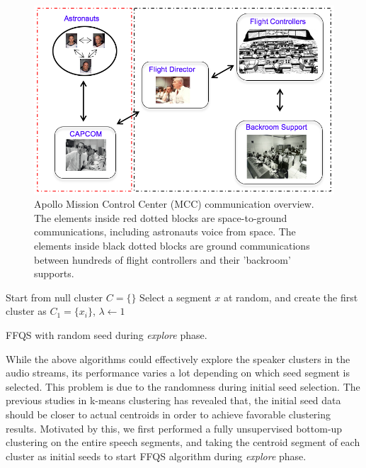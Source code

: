 \documentclass[journal]{IEEEtran}
\begin{document}
\begin{figure}[t]
\centering
	\includegraphics[width=0.75\linewidth]{figs/comm5}
	\caption{Apollo Mission Control Center (MCC) communication overview. The elements inside red dotted blocks are space-to-ground communications, including astronauts voice from space. The elements inside black dotted blocks are ground communications between hundreds of flight controllers and their 'backroom' supports. }
	\label{fig:comm}
\end{figure} 
\begin{algorithm}
	Start from null cluster $C= \{\}$\;
	Select a segment $x$ at random, and create the first cluster as $C_1 = \{x_i\}$, $\lambda \leftarrow 1$\; 
	\caption{FFQS with random seed during \textit{explore} phase.}
	\label{a1}
\end{algorithm}
 
While the above algorithms could effectively explore the speaker clusters in the audio streams, its performance varies a lot depending on which seed segment is selected. This problem is due to the randomness during initial seed selection. The previous studies in k-means clustering has revealed that, the initial seed data should be closer to actual centroids in order to achieve favorable clustering results. Motivated by this, we first performed a fully unsupervised bottom-up clustering on the entire speech segments, and taking the centroid segment of each cluster as initial seeds to start FFQS algorithm during \textit{explore} phase.
\end{document}
